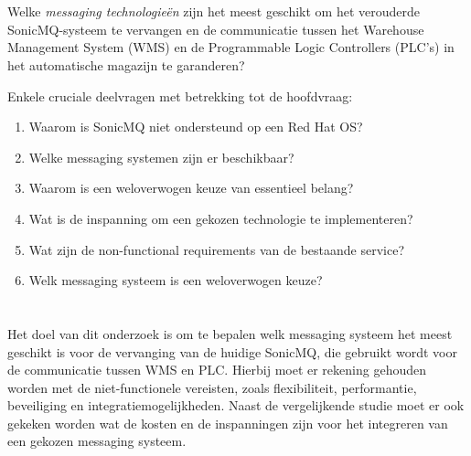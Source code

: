 \section{}%
\label{sec:onderzoeksvraag}


Welke \emph{messaging technologieën} zijn het meest geschikt om het verouderde SonicMQ-systeem te vervangen 
en de communicatie tussen het Warehouse Management System (WMS) en de Programmable Logic Controllers (PLC’s) 
in het automatische magazijn te garanderen?

Enkele cruciale deelvragen met betrekking tot de hoofdvraag:
\begin{enumerate}
  \item Waarom is SonicMQ niet ondersteund op een Red Hat OS?
  \item Welke messaging systemen zijn er beschikbaar?
  \item Waarom is een weloverwogen keuze van essentieel belang?
  \item Wat is de inspanning om een gekozen technologie te implementeren?
  \item Wat zijn de non-functional requirements van de bestaande service?
  \item Welk messaging systeem is een weloverwogen keuze?
\end{enumerate}


\section{}%
\label{sec:onderzoeksdoelstelling}


Het doel van dit onderzoek is om te bepalen welk messaging systeem het meest geschikt is voor de vervanging van de huidige SonicMQ,
die gebruikt wordt voor de communicatie tussen WMS en PLC. 
Hierbij moet er rekening gehouden worden met de niet-functionele vereisten,
zoals flexibiliteit, performantie, beveiliging en integratiemogelijkheden.
Naast de vergelijkende studie moet er ook gekeken worden wat de kosten en de inspanningen zijn 
voor het integreren van een gekozen messaging systeem. 

